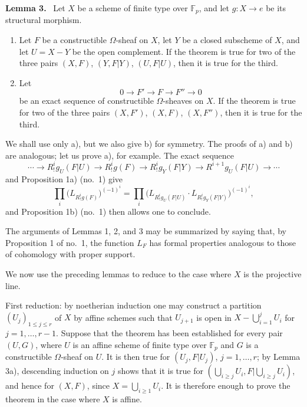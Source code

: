 \documentclass[11pt]{article}
\newenvironment{statement}[1]{\par\medskip\noindent\textbf{#1.}\ }{\par\medskip}
\begin{document}
\begin{statement}{Lemma 3}
Let $X$ be a scheme of finite type over $\mathbb F_p$, and let $g:X\to e$ be its structural morphism.
\begin{enumerate}[label=\alph*)]
\item Let $F$ be a constructible $\Omega$-sheaf on $X$, let $Y$ be a closed subscheme of $X$, and let $U=X-Y$ be the open complement. If the theorem is true for two of the three pairs $(X,F)$, $(Y,F|Y)$, $(U,F|U)$, then it is true for the third.
\item Let
\[
0\longrightarrow F'\longrightarrow F\longrightarrow F''\longrightarrow0
\]
be an exact sequence of constructible $\Omega$-sheaves on $X$. If the theorem is true for two of the three pairs $(X,F')$, $(X,F)$, $(X,F'')$, then it is true for the third.
\end{enumerate}
\end{statement}

We shall use only a), but we also give b) for symmetry. The proofs of a) and b) are analogous; let us prove a), for example. The exact sequence
\[
\cdots\longrightarrow R^i_!g_U(F|U)\longrightarrow R^i_!g(F)
\longrightarrow R^i_!g_Y(F|Y)\longrightarrow R^{i+1}g_U(F|U)\longrightarrow\cdots
\]
and Proposition 1a) (no.~1) give
\[
\prod_i\bigl(L_{R^i_!g(F)}\bigr)^{(-1)^i}
=\prod_i\bigl(L_{R^i_!g_U(F|U)}\cdot L_{R^i_!g_Y(F|Y)}\bigr)^{(-1)^i},
\]
and Proposition 1b) (no.~1) then allows one to conclude.

The arguments of Lemmas 1, 2, and 3 may be summarized by saying that, by Proposition 1 of no.~1, the function $L_F$ has formal properties analogous to those of cohomology with proper support.

We now use the preceding lemmas to reduce to the case where $X$ is the projective line.

First reduction: by noetherian induction one may construct a partition $(U_j)_{1\le j\le r}$ of $X$ by affine schemes such that $U_{j+1}$ is open in $X-\bigcup_{i=1}^jU_i$ for $j=1,\ldots,r-1$. Suppose that the theorem has been established for every pair $(U,G)$, where $U$ is an affine scheme of finite type over $\mathbb F_p$ and $G$ is a constructible $\Omega$-sheaf on $U$. It is then true for $(U_j,F|U_j)$, $j=1,\ldots,r$; by Lemma 3a), descending induction on $j$ shows that it is true for $(\bigcup_{i\ge j}U_i,F|\bigcup_{i\ge j}U_i)$, and hence for $(X,F)$, since $X=\bigcup_{i\ge1}U_i$. It is therefore enough to prove the theorem in the case where $X$ is affine.
\end{document}
